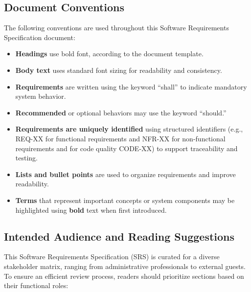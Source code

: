 \documentclass[11pt, a4paper]{article}
\begin{document}
\subsection{Document Conventions}
The following conventions are used throughout this Software Requirements Specification document:
\begin{itemize}
    \item \textbf{Headings} use bold font, according to the document template.
    \item \textbf{Body text} uses standard font sizing for readability and consistency.
    \item \textbf{Requirements} are written using the keyword ``shall'' to indicate mandatory system behavior.
    \item \textbf{Recommended} or optional behaviors may use the keyword ``should.''
    \item \textbf{Requirements are uniquely identified} using structured identifiers (e.g., REQ-XX for functional requirements and NFR-XX for non-functional requirements and for code quality CODE-XX) to support traceability and testing.
    \item \textbf{Lists and bullet points} are used to organize requirements and improve readability.
    \item \textbf{Terms} that represent important concepts or system components may be highlighted using \textbf{bold} text when first introduced.
\end{itemize}

\subsection{Intended Audience and Reading Suggestions}
This Software Requirements Specification (SRS) is curated for a diverse stakeholder matrix, ranging from administrative professionals to external guests. To ensure an efficient review process, readers should prioritize sections based on their functional roles:
\end{document}

